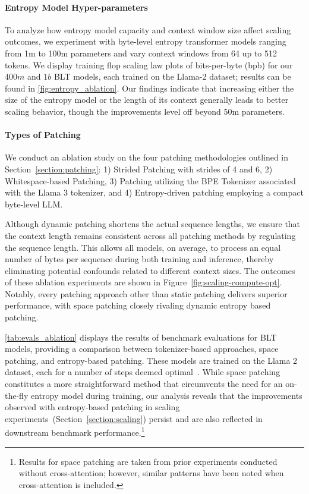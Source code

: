 \paragraph{Entropy Model Hyper-parameters} To analyze how entropy model capacity and context window size affect scaling outcomes, we experiment with byte-level entropy transformer models ranging from 1m to 100m parameters and vary context windows from 64 up to 512 tokens. We display training flop scaling law plots of bits-per-byte (bpb) for our $400m$ and $1b$ {\textsc BLT} models, each trained on the Llama-2 dataset; results can be found in \autoref{fig:entropy_ablation}. Our findings indicate that increasing either the size of the entropy model or the length of its context generally leads to better scaling behavior, though the improvements level off beyond 50m parameters.

\paragraph{Types of Patching}

We conduct an ablation study on the four patching methodologies outlined in Section~\ref{section:patching}: 1) Strided Patching with strides of 4 and 6, 2) Whitespace-based Patching, 3) Patching utilizing the BPE Tokenizer associated with the Llama 3 tokenizer, and 4) Entropy-driven patching employing a compact byte-level LLM.

Although dynamic patching shortens the actual sequence lengths, we ensure that the context length remains consistent across all patching methods by regulating the sequence length. This allows all models, on average, to process an equal number of bytes per sequence during both training and inference, thereby eliminating potential confounds related to different context sizes. The outcomes of these ablation experiments are shown in Figure~\ref{fig:scaling-compute-opt}. Notably, every patching approach other than static patching delivers superior performance, with space patching closely rivaling dynamic entropy based patching.

\autoref{tab:evals_ablation} displays the results of benchmark evaluations for {\textsc BLT} models, providing a comparison between tokenizer-based approaches, space patching, and entropy-based patching. These models are trained on the Llama 2 dataset, each for a number of steps deemed optimal~\citep{dubey2024llama}. While space patching constitutes a more straightforward method that circumvents the need for an on-the-fly entropy model during training, our analysis reveals that the improvements observed with entropy-based patching in scaling experiments~(Section~\ref{section:scaling}) persist and are also reflected in downstream benchmark performance.\footnote{Results for space patching are taken from prior experiments conducted without cross-attention; however, similar patterns have been noted when cross-attention is included.}


